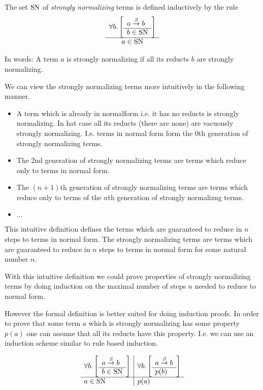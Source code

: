 \begin{definition}
    The set $\text{SN}$ of \emph{strongly normalizing} terms is defined inductively
    by the rule
    $$
        \begin{array}{c} 
            \forall b. \left[ \begin{array}{l} a \stackrel{\beta}{\to} b \\ \hline b \in \text{SN}\end{array} \right]
         \\ \hline 
            a \in \text{SN}
        \end{array}
    $$
\end{definition}

In words: A term $a$ is strongly normalizing if all its reducts $b$ are strongly
normalizing.

We can view the strongly normalizing terms more intuitively in the following
manner.

\begin{itemize}

    \item A term which is already in normalform i.e. it has no reducts is
        strongly normalizing. In hat case all its reducts (there are none) are
        vacuously strongly normalizing. I.e. terms in normal form form the
        $0$th generation of strongly normalizing terms.

    \item The 2nd generation of strongly normalizing terms are terms which
        reduce only to terms in normal form.

    \item The $(n+1)$th generation of strongly normalizing terms are terms which
        reduce only to terms of the $n$th generation of strongly normalizng
        terms.

    \item $\ldots$

\end{itemize}

This intuitive definition defines the terms which are guaranteed to reduce in
$n$ steps to terms in normal form. The strongly normalizing terms are terms
which are guaranteed to reduce in $n$ steps to terms in normal form for some
natural number $n$.

With this intuitive definition we could prove properties of strongly normalizing
terms by doing induction on the maximal number of steps $n$ needed to reduce to
normal form.


However the formal definition is better suited for doing induction proofs. In
order to prove that some term $a$ which is strongly normalizing has some
property $p(a)$ one can assume that all its reducts have this property. I.e. we
can use an induction scheme similar to rule based induction.

$$
    \begin{array}{l|l}
        \forall b. \left[ \begin{array}{l} a \stackrel{\beta}{\to} b \\ \hline b \in \text{SN}\end{array} \right]
        &
        \forall b. \left[ \begin{array}{l} a \stackrel{\beta}{\to} b \\ \hline p(b)\end{array} \right]
        \\
        \hline
        a \in \text{SN}
        &
        p(a)
    \end{array}
$$

